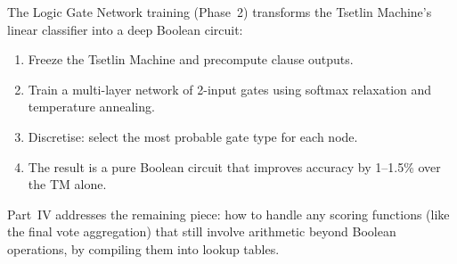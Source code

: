 The Logic Gate Network training (Phase~2) transforms the Tsetlin
Machine's linear classifier into a deep Boolean circuit:

\begin{enumerate}
  \item Freeze the Tsetlin Machine and precompute clause outputs.
  \item Train a multi-layer network of 2-input gates using softmax
    relaxation and temperature annealing.
  \item Discretise: select the most probable gate type for each node.
  \item The result is a pure Boolean circuit that improves accuracy by
    1--1.5\% over the TM alone.
\end{enumerate}

Part~IV addresses the remaining piece: how to handle any scoring
functions (like the final vote aggregation) that still involve
arithmetic beyond Boolean operations, by compiling them into lookup
tables.
